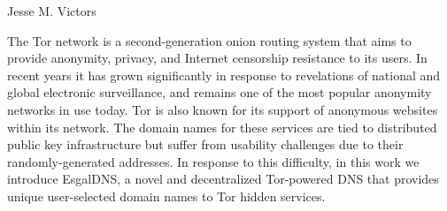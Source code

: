 \begin{publicabstract}
\centerline{Jesse M. Victors}
\vspace{12pt}

The Tor network is a second-generation onion routing system that aims to provide anonymity, privacy, and Internet censorship resistance to its users. In recent years it has grown significantly in response to revelations of national and global electronic surveillance, and remains one of the most popular anonymity networks in use today. Tor is also known for its support of anonymous websites within its network. The domain names for these services are tied to distributed public key infrastructure but suffer from usability challenges due to their randomly-generated addresses. In response to this difficulty, in this work we introduce EsgalDNS, a novel and decentralized Tor-powered DNS that provides unique user-selected domain names to Tor hidden services.

\end{publicabstract}
